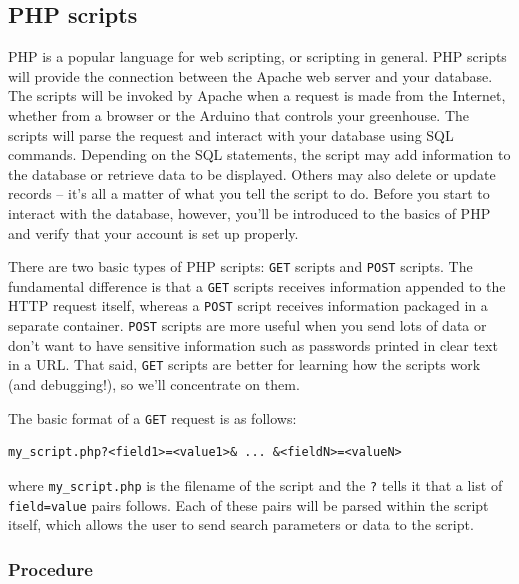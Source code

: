 \documentclass[11pt]{article} %
\begin{document}
\subsection*{PHP scripts}
\label{sec:php.basic}
PHP is a popular language for web scripting, or scripting in general. PHP scripts will provide the connection between the Apache web server and your database. The scripts will be invoked by Apache when a request is made from the Internet, whether from a browser or the Arduino that controls your greenhouse. The scripts will parse the request and interact with your database using SQL commands. Depending on the SQL statements, the script may add information to the database or retrieve data to be displayed. Others may also delete or update records -- it’s all a matter of what you tell the script to do. Before you start to interact with the database, however, you’ll be introduced to the basics of PHP and verify that your account is set up properly.

There are two basic types of PHP scripts: \verb|GET| scripts and \verb|POST| scripts. The fundamental difference is that a \verb|GET| scripts receives information appended to the HTTP request itself, whereas a \verb|POST| script receives information packaged in a separate container. \verb|POST| scripts are more useful when you send lots of data or don’t want to have sensitive information such as passwords printed in clear text in a URL. That said, \verb|GET| scripts are better for learning how the scripts work (and debugging!), so we’ll concentrate on them.

The basic format of a \verb|GET| request is as follows:

\begin{verbatim}
my_script.php?<field1>=<value1>& ... &<fieldN>=<valueN>
\end{verbatim}

where \verb|my_script.php| is the filename of the script and the \verb|?| tells it that a list of \verb|field=value| pairs follows. Each of these pairs will be parsed within the script itself, which allows the user to send search parameters or data to the script.

\subsubsection*{Procedure}
\end{document}
